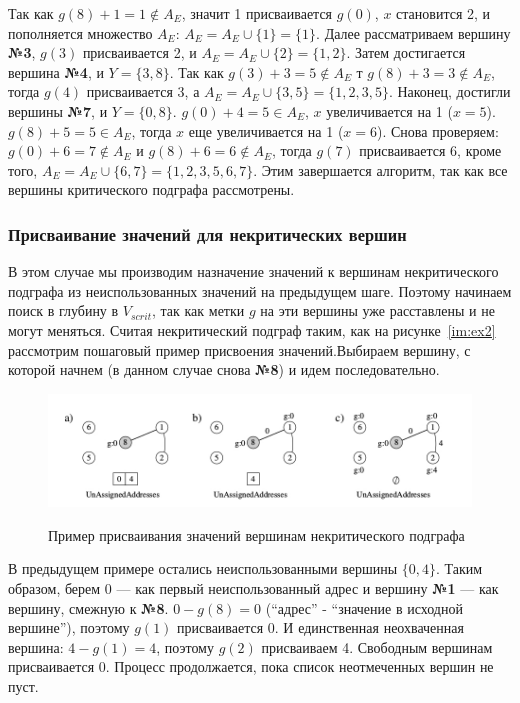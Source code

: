 \documentclass[specialist,
               substylefile = spbu.rtx,
               subf,href,colorlinks=true, 12pt]{disser}
\begin{document}
Так как $g(8) + 1 = 1 \notin A_E$, значит 1 присваивается $g(0)$, $x$ становится 2, и пополняется множество $A_E$: $A_E = A_E \cup \{1\} = \{1\}$. Далее рассматриваем вершину \textbf{№3}, $g(3)$ присваивается 2,  и $A_E = A_E \cup \{2\} = \{1,2\}$. Затем достигается вершина \textbf{№4}, и $Y = \{3,8\}$. Так как $g(3) + 3 = 5 \notin A_E$ т $g(8) + 3 = 3 \notin A_E$, тогда $g(4)$ присваивается 3, а $A_E = A_E \cup \{3,5\} = \{1,2,3,5\}$. Наконец, достигли вершины \textbf{№7}, и $Y = \{0,8\}$. $g(0) + 4 = 5 \in A_E$, $x$ увеличивается на 1 ($x = 5$). $g(8) + 5 = 5 \in A_E$, тогда $x$ еще увеличивается на 1 ($x = 6$). Снова проверяем: $g(0) + 6 = 7 \notin A_E$ и $g(8) + 6 = 6 \notin A_E$, тогда $g(7)$ присваивается 6, кроме того, $A_E = A_E \cup \{6,7\} = \{1,2,3,5,6,7\}$. Этим завершается алгоритм, так как все вершины критического подграфа рассмотрены.

\subsubsection{Присваивание значений для некритических вершин}

В этом случае мы производим назначение значений к вершинам некритического подграфа из неиспользованных значений на предыдущем шаге. Поэтому начинаем поиск в глубину в $V_{scrit}$, так как метки $g$ на эти вершины уже расставлены и не могут меняться. Считая некритический подграф таким, как на рисунке~\ref{im:ex2} рассмотрим пошаговый пример присвоения значений.Выбираем вершину, с которой начнем (в данном случае снова \textbf{№8}) и идем последовательно.

\begin{figure}[h]
\begin{center}
\includegraphics[scale=0.35]{imgs/ex4.jpg}\label{im:ex4}
\caption{Пример присваивания значений вершинам некритического подграфа}
\end{center}
\end{figure}

В предыдущем примере остались неиспользованными вершины $\{0,4\}$. Таким образом, берем 0 --- как первый неиспользованный адрес и вершину \textbf{№1} --- как вершину, смежную к \textbf{№8}. $0 - g(8) = 0$ (``адрес'' - ``значение в исходной вершине''), поэтому $g(1)$ присваивается 0. И единственная неохваченная вершина: $4 - g(1) = 4$, поэтому $g(2)$ присваиваем 4. Свободным вершинам присваивается 0. Процесс продолжается, пока список неотмеченных вершин не пуст.
\end{document}
